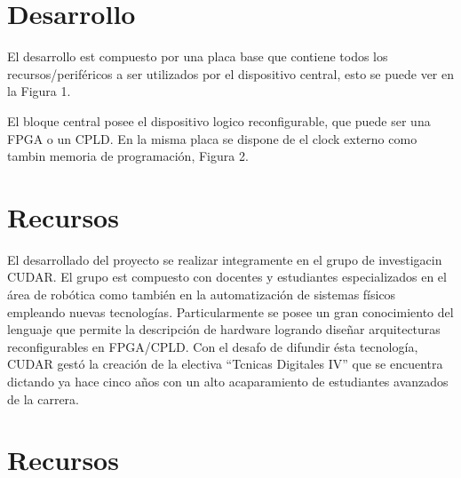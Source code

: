 \documentclass[10pt,a4paper,titlepage,spanish]{article}
\begin{document}
\setlength{\headrulewidth}{0.4pt}


\section{Desarrollo}

El desarrollo est compuesto por una placa base que contiene todos los recursos/periféricos a ser utilizados por el dispositivo central, esto se puede ver en la Figura 1.
%

%

El bloque central posee el dispositivo logico reconfigurable, que puede ser una FPGA o un CPLD. En la misma placa se dispone de el clock externo como tambin memoria de programación, Figura 2.
\section{Recursos}

El desarrollado del proyecto se realizar integramente en el grupo de investigacin CUDAR. El grupo est compuesto con docentes y estudiantes especializados en el área de robótica como también en la automatización de sistemas físicos empleando nuevas tecnologías. Particularmente se posee un gran conocimiento del lenguaje que permite la descripción
de hardware logrando diseñar arquitecturas reconfigurables en FPGA/CPLD.
Con el desafo de difundir ésta tecnología, CUDAR gestó la creación de la electiva \textquotedblleft{}Tcnicas Digitales IV\textquotedblright{} que se encuentra dictando ya hace cinco años con un alto acaparamiento de estudiantes avanzados de la carrera.
\section{Recursos}
\end{document}
